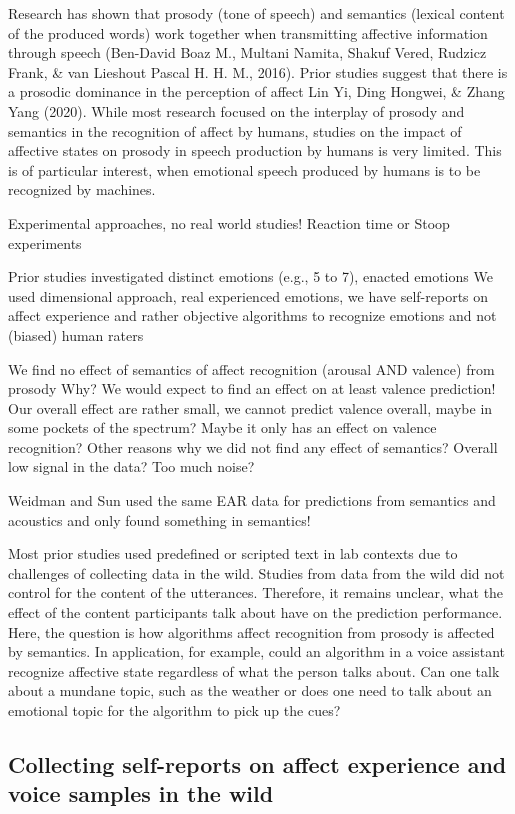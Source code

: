 \documentclass[
  english,
  man,floatsintext]{apa6}
\begin{document}
Research has shown that prosody (tone of speech) and semantics (lexical content of the produced words) work together when transmitting affective information through speech (Ben-David Boaz M., Multani Namita, Shakuf Vered, Rudzicz Frank, \& van Lieshout Pascal H. H. M., 2016). Prior studies suggest that there is a prosodic dominance in the perception of affect Lin Yi, Ding Hongwei, \& Zhang Yang (2020). While most research focused on the interplay of prosody and semantics in the recognition of affect by humans, studies on the impact of affective states on prosody in speech production by humans is very limited. This is of particular interest, when emotional speech produced by humans is to be recognized by machines.

Experimental approaches, no real world studies! Reaction time or Stoop experiments

Prior studies investigated distinct emotions (e.g., 5 to 7), enacted emotions
We used dimensional approach, real experienced emotions, we have self-reports on affect experience and rather objective algorithms to recognize emotions and not (biased) human raters

We find no effect of semantics of affect recognition (arousal AND valence) from prosody
Why? We would expect to find an effect on at least valence prediction! Our overall effect are rather small, we cannot predict valence overall, maybe in some pockets of the spectrum? Maybe it only has an effect on valence recognition?
Other reasons why we did not find any effect of semantics? Overall low signal in the data? Too much noise?

Weidman and Sun used the same EAR data for predictions from semantics and acoustics and only found something in semantics!

Most prior studies used predefined or scripted text in lab contexts due to challenges of collecting data in the wild.
Studies from data from the wild did not control for the content of the utterances.
Therefore, it remains unclear, what the effect of the content participants talk about have on the prediction performance. Here, the question is how algorithms affect recognition from prosody is affected by semantics. In application, for example, could an algorithm in a voice assistant recognize affective state regardless of what the person talks about. Can one talk about a mundane topic, such as the weather or does one need to talk about an emotional topic for the algorithm to pick up the cues?

\hypertarget{collecting-self-reports-on-affect-experience-and-voice-samples-in-the-wild}{%
\subsection{Collecting self-reports on affect experience and voice samples in the wild}\label{collecting-self-reports-on-affect-experience-and-voice-samples-in-the-wild}}
\end{document}
